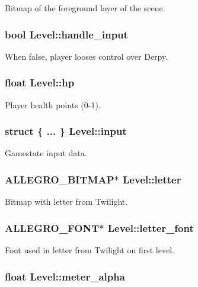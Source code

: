 Bitmap of the foreground layer of the scene. \hypertarget{structLevel_a06cf4f2da517284d2006540051d3e5c0}{
\subsubsection[{handle\-\_\-input}]{\setlength{\rightskip}{0pt plus 5cm}bool Level\-::handle\-\_\-input}}\label{structLevel_a06cf4f2da517284d2006540051d3e5c0}
When false, player looses control over Derpy. \hypertarget{structLevel_a49df009e8113251cfcb48fe17df0b571}{
\subsubsection[{hp}]{\setlength{\rightskip}{0pt plus 5cm}float Level\-::hp}}\label{structLevel_a49df009e8113251cfcb48fe17df0b571}
Player health points (0-\/1). \hypertarget{structLevel_a238f3f47a5598d7150c6bba03b4f6dda}{
\subsubsection[{input}]{\setlength{\rightskip}{0pt plus 5cm}struct \{ ... \}   Level\-::input}}\label{structLevel_a238f3f47a5598d7150c6bba03b4f6dda}
Gamestate input data. \hypertarget{structLevel_af1b1699478b4633d76c01ea09e666df4}{
\subsubsection[{letter}]{\setlength{\rightskip}{0pt plus 5cm}A\-L\-L\-E\-G\-R\-O\-\_\-\-B\-I\-T\-M\-A\-P$\ast$ Level\-::letter}}\label{structLevel_af1b1699478b4633d76c01ea09e666df4}
Bitmap with letter from Twilight. \hypertarget{structLevel_a69e6eae14648fd488a1dec0f55e4d293}{
\subsubsection[{letter\-\_\-font}]{\setlength{\rightskip}{0pt plus 5cm}A\-L\-L\-E\-G\-R\-O\-\_\-\-F\-O\-N\-T$\ast$ Level\-::letter\-\_\-font}}\label{structLevel_a69e6eae14648fd488a1dec0f55e4d293}
Font used in letter from Twilight on first level. \hypertarget{structLevel_a246ce1ecf1523db218cf067df15e511f}{
\subsubsection[{meter\-\_\-alpha}]{\setlength{\rightskip}{0pt plus 5cm}float Level\-::meter\-\_\-alpha}}\label{structLevel_a246ce1ecf1523db218cf067df15e511f}
